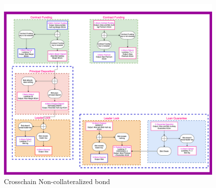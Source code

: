 \begin{figure}
    \centering
    \includegraphics[width=\textwidth]{figures/non-collateralized-bond-checkseq-cross-chain.png}
    \caption{Crosschain Non-collateralized bond}
    \label{fig:cross-chain-non-collat-bond}
\end{figure}


